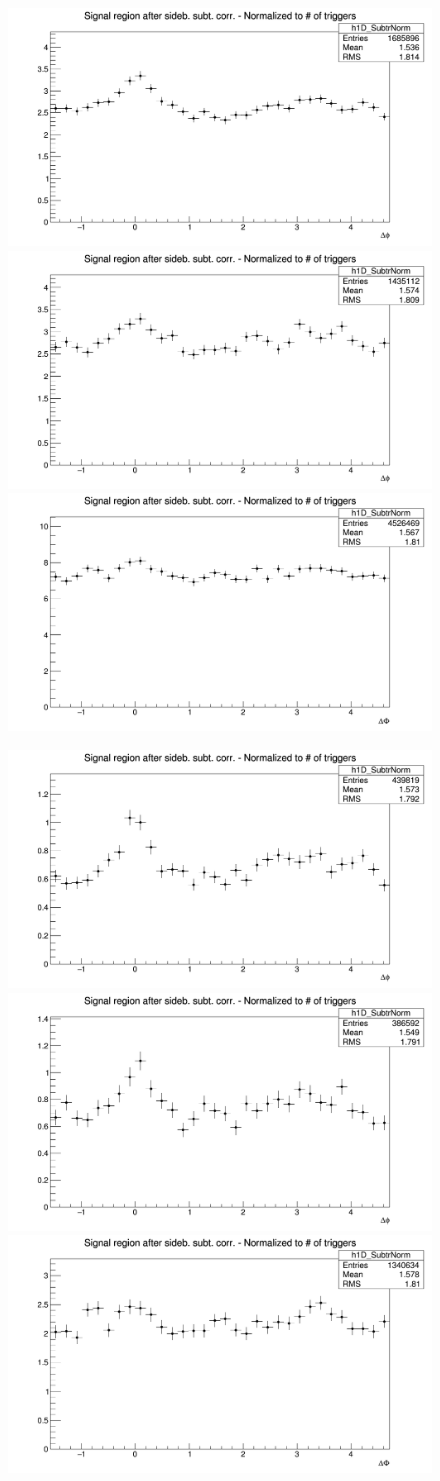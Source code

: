 \begin{figure}[htbp]
{\includegraphics[width=0.31\linewidth, height=0.23\linewidth]
{figures/Dzero/AzimCorrDistr_Dzero_Canvas_PtIntBins4to5_PoolInt_thrdot3to99dot.png}}
{\includegraphics[width=0.31\linewidth, height=0.23\linewidth]{figures/DplusPlotsweff/AzimCorrDistr_Dplus_Canvas_PtIntBins3to4_PoolInt_thrdot3to99dot.png}}
{\includegraphics[width=0.31\linewidth, height=0.23\linewidth]{figures/Dstar_wEFF/AzimCorrDistr_Dstar_Canvas_PtIntBins2to3_PoolInt_thrdot3to99dot.png}}

{\includegraphics[width=0.31\linewidth, height=0.23\linewidth]{figures/Dzero/AzimCorrDistr_Dzero_Canvas_PtIntBins4to5_PoolInt_thr1dotto99dot.png}}
{\includegraphics[width=0.31\linewidth, height=0.23\linewidth]{figures/DplusPlotsweff/AzimCorrDistr_Dplus_Canvas_PtIntBins3to4_PoolInt_thr1dotto99dot.png}}
{\includegraphics[width=0.31\linewidth, height=0.23\linewidth]{figures/Dstar_wEFF/AzimCorrDistr_Dstar_Canvas_PtIntBins2to3_PoolInt_thr1dotto99dot.png}}


\end{figure}

